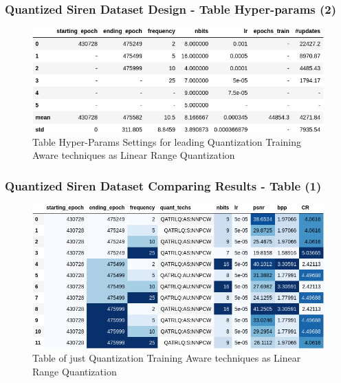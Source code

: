 \begin{frame}
\frametitle{Quantized Siren Dataset Design -  Table Hyper-params (2)}


\begin{figure}
\includegraphics[scale=0.5]{slides/experiments/quant_dataset/listed_hyper_params_sets.png}
\caption{Table Hyper-Params Settings for leading Quantization Training Aware techniques as Linear Range Quantization}
\end{figure}

\end{frame}

\begin{frame}
\frametitle{Quantized Siren Dataset Comparing Results -  Table (1)}


\begin{figure}
\includegraphics[scale=0.5]{slides/experiments/quant_dataset/a_table.png}
\caption{Table of just Quantization Training Aware techniques as Linear Range Quantization}
\end{figure}

\end{frame}


